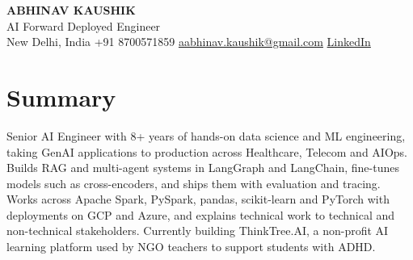 \documentclass[10pt,a4paper]{article}
\begin{document}
\begin{center}
  {\LARGE\bfseries ABHINAV KAUSHIK}\\[2pt]
  {\large AI Forward Deployed Engineer}\\[2pt]
  New Delhi, India \textbar{} +91 8700571859 \textbar{} \href{mailto:aabhinav.kaushik@gmail.com}{aabhinav.kaushik@gmail.com} \textbar{} \href{https://www.linkedin.com/in/abhinav-kaushik10/}{LinkedIn}  
\end{center}

\section{Summary}
Senior AI Engineer with 8+ years of hands-on data science and ML engineering, taking GenAI applications to production across Healthcare, Telecom and AIOps. Builds RAG and multi-agent systems in LangGraph and LangChain, fine-tunes models such as cross-encoders, and ships them with evaluation and tracing. Works across Apache Spark, PySpark, pandas, scikit-learn and PyTorch with deployments on GCP and Azure, and explains technical work to technical and non-technical stakeholders. Currently building ThinkTree.AI, a non-profit AI learning platform used by NGO teachers to support students with ADHD.
\end{document}
